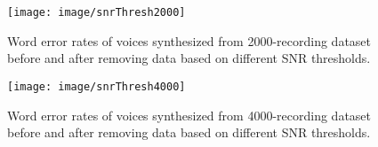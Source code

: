 \documentclass[12pt]{article}
\begin{document}

\begin{figure}[t]
\begin{center}
\texttt{[image: image/snrThresh2000]}
\end{center}
\vspace{-0.3cm}
\caption[Word error rates of voices synthesized from 2000-recording dataset before and after removing data based on different SNR thresholds.]{Word error rates of voices synthesized from 2000-recording dataset before and after removing data based on different SNR thresholds.}
\label{fig_snrThresh2000}
\end{figure}

\begin{figure}[t]
\begin{center}
\texttt{[image: image/snrThresh4000]}
\end{center}
\vspace{-0.3cm}
\caption[Word error rates of voices synthesized from 4000-recording dataset before and after removing data based on different SNR thresholds.]{Word error rates of voices synthesized from 4000-recording dataset before and after removing data based on different SNR thresholds.}
\label{fig_snrThresh4000}
\end{figure}
\end{document}

